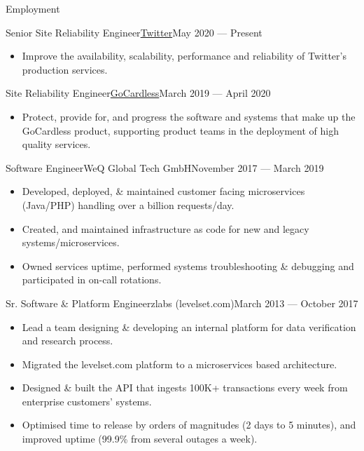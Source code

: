 \documentclass[]{mosabcv}
\begin{document}
\makeheader{}

\begin{cvsection}{Employment}
  \begin{cvsubsection}{Senior Site Reliability
    Engineer}{\href{https://twitter.com}{Twitter}}{May 2020 ---
    Present}
    \begin{itemize}
      \item Improve the availability, scalability, performance and reliability
        of Twitter’s production services.
    \end{itemize}
  \end{cvsubsection}

  \begin{cvsubsection}{Site Reliability
    Engineer}{\href{https://gocardless.com}{GoCardless}}{March 2019 ---
    April 2020}
    \begin{itemize}
      \item Protect, provide for, and progress the software and systems that
        make up the GoCardless product, supporting product teams in the
        deployment of high quality services.
    \end{itemize}

  \end{cvsubsection}

  \begin{cvsubsection}{Software Engineer}{WeQ Global Tech GmbH}{November 2017 ---
    March 2019}    \begin{itemize}
      \item Developed, deployed, \& maintained customer facing microservices
        (Java/PHP) handling over a billion requests/day.
      \item Created, and maintained infrastructure as code for new and legacy
        systems/microservices.
      \item Owned services uptime, performed systems troubleshooting \&
        debugging and participated in on-call rotations.
    \end{itemize}
  \end{cvsubsection}

  \begin{cvsubsection}{Sr. Software \& Platform Engineer}{zlabs
    (levelset.com)}{March 2013 --- October 2017}
    \begin{itemize}
      \item Lead a team designing \& developing an internal platform for data
        verification and research process.
      \item Migrated the levelset.com platform to a microservices based
        architecture.
      \item Designed \& built the API that ingests 100K+ transactions
        every week from enterprise customers' systems.
      \item Optimised time to release by orders of magnitudes (2 days to 5
        minutes), and improved uptime (99.9\% from several outages a week).
    \end{itemize}
  \end{cvsubsection}


\end{cvsection}
\end{document}
